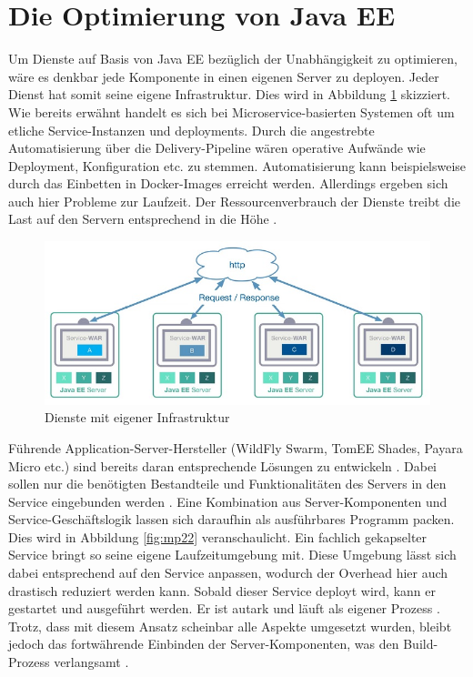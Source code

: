 \section{Die Optimierung von Java EE}
Um Dienste auf Basis von Java EE bezüglich der Unabhängigkeit zu optimieren, wäre es denkbar jede Komponente in einen eigenen Server zu deployen. Jeder Dienst hat somit seine eigene Infrastruktur. Dies wird in Abbildung \ref{fig:mp2} skizziert. Wie bereits erwähnt handelt es sich bei Microservice-basierten Systemen oft um etliche Service-Instanzen und deployments. Durch die angestrebte Automatisierung über die Delivery-Pipeline wären operative Aufwände wie Deployment, Konfiguration etc. zu stemmen. Automatisierung kann beispielsweise durch das Einbetten in Docker-Images erreicht werden. Allerdings ergeben sich auch hier Probleme zur Laufzeit. Der Ressourcenverbrauch der Dienste treibt die Last auf den Servern entsprechend in die Höhe \cite{LarsRowekamp.2017d}. \\
\begin{figure}[h!]
	\centering
	\includegraphics[width=1.0\linewidth]{images/mp2}
	\caption{Dienste mit eigener Infrastruktur \cite{LarsRowekamp.2017d}}
	\label{fig:mp2}
\end{figure}
Führende Application-Server-Hersteller (WildFly Swarm, TomEE Shades, Payara Micro etc.) sind bereits daran entsprechende Lösungen zu entwickeln \cite{LarsRowekamp.2016}. Dabei sollen nur die benötigten Bestandteile und Funktionalitäten des Servers in den Service eingebunden werden \cite{jaxcenter.2016}. Eine Kombination aus Server-Komponenten und Service-Geschäftslogik lassen sich daraufhin als ausführbares Programm packen. Dies wird in Abbildung \ref{fig:mp22} veranschaulicht. Ein fachlich gekapselter Service bringt so seine eigene Laufzeitumgebung mit. Diese Umgebung lässt sich dabei entsprechend auf den Service anpassen, wodurch der Overhead hier auch drastisch reduziert werden kann. Sobald dieser Service deployt wird, kann er gestartet und ausgeführt werden. Er ist autark und läuft als eigener Prozess \cite{jaxcenter.2016}. Trotz, dass mit diesem Ansatz scheinbar alle Aspekte umgesetzt wurden, bleibt jedoch das fortwährende Einbinden der Server-Komponenten, was den Build-Prozess verlangsamt \cite{LarsRowekamp.2017d}.
